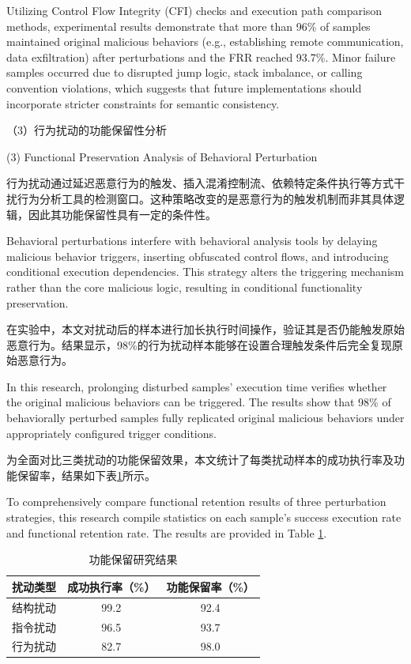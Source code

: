 Utilizing Control Flow Integrity (CFI) checks and execution path comparison methods, experimental results demonstrate that more than 96\% of samples maintained original malicious behaviors (e.g., establishing remote communication, data exfiltration) after perturbations and the FRR reached 93.7\%. Minor failure samples occurred due to disrupted jump logic, stack imbalance, or calling convention violations, which suggests that future implementations should incorporate stricter constraints for semantic consistency.

（3）行为扰动的功能保留性分析

(3) Functional Preservation Analysis of Behavioral Perturbation

行为扰动通过延迟恶意行为的触发、插入混淆控制流、依赖特定条件执行等方式干扰行为分析工具的检测窗口。这种策略改变的是恶意行为的触发机制而非其具体逻辑，因此其功能保留性具有一定的条件性。

Behavioral perturbations interfere with behavioral analysis tools by delaying malicious behavior triggers, inserting obfuscated control flows, and introducing conditional execution dependencies. This strategy alters the triggering mechanism rather than the core malicious logic, resulting in conditional functionality preservation.

在实验中，本文对扰动后的样本进行加长执行时间操作，验证其是否仍能触发原始恶意行为。结果显示，98\%的行为扰动样本能够在设置合理触发条件后完全复现原始恶意行为。

In this research, prolonging disturbed samples' execution time verifies whether the original malicious behaviors can be triggered. The results show that 98\% of behaviorally perturbed samples fully replicated original malicious behaviors under appropriately configured trigger conditions.

为全面对比三类扰动的功能保留效果，本文统计了每类扰动样本的成功执行率及功能保留率，结果如下表\ref{tab:5.12}所示。

To comprehensively compare functional retention results of three perturbation strategies, this research compile statistics on each sample's success execution rate and functional retention rate. The results are provided in Table \ref{tab:5.12}.

\begin{table}[htb]
	\centering
	\caption{功能保留研究结果}
	\label{tab:5.12}
	\begin{tabular*}{0.9\textwidth}{@{\extracolsep{\fill}}ccc}
		\toprule
		扰动类型 & 成功执行率（\%） & 功能保留率（\%） \\
		\midrule
		结构扰动 & 99.2 & 92.4 \\
		指令扰动 & 96.5 & 93.7 \\
		行为扰动 & 82.7 & 98.0 \\
		\bottomrule
	\end{tabular*}
\end{table}

